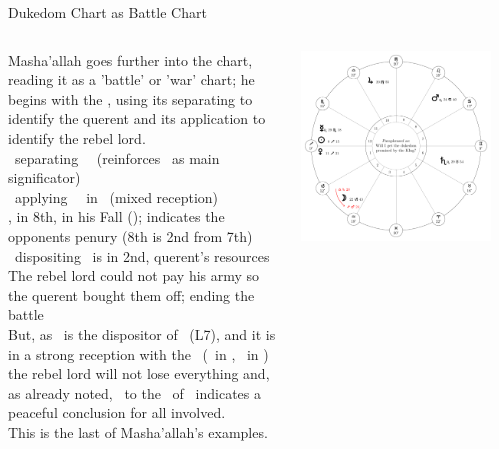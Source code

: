 \begin{frame}[t]{Dukedom Chart as Battle Chart}
\footnotesize
\begin{columns}[T, onlytextwidth]
Masha'allah goes further into the chart, reading it as a 'battle' or 'war' chart; he begins with the \Moon, using its separating to identify the querent and its application to identify the rebel lord. \\
\vspace{0.25cm}
\Moon\ separating \Trine\ \Jupiter\ (reinforces \Jupiter\ as main significator) \\
\Moon\ applying \Opposition\ \Mars\ in \Cancer\ (mixed reception) \\
\vspace{0.2cm}
\Mars\Retrograde, in 8th, in his Fall (\Cancer); indicates the opponents penury (8th is 2nd from 7th) \\
\vspace{0.2cm}
\Moon\ dispositing \Mars\ is in 2nd, querent's resources \\
The rebel lord could not pay his army so the querent bought them off; ending the battle \\
\vspace{0.25cm}
But, as \Mars\ is the dispositor of \Mercury\ (L7), and it is in a strong reception with the \Moon\ (\Mars\ in \Cancer, \Moon\ in \Capricorn) the rebel lord will not lose everything and, as already noted, \Mercury\ to the \Sextile\ of \Jupiter\ indicates a peaceful conclusion for all involved.\\
\vspace{0.2cm}
This is the last of Masha'allah's examples.
\begin{center}
{\includegraphics[width=0.9\textwidth]{charts/52a-chart-dukedom}} \\
\end{center}
\end{columns}
\end{frame}